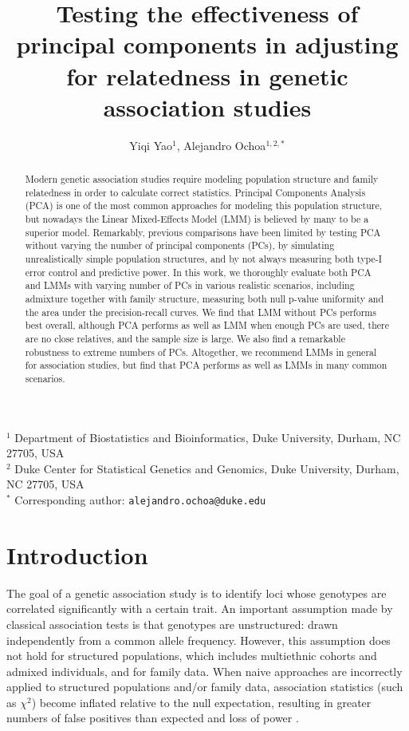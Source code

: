 \documentclass[11pt]{article}
\title{\Large \textbf{Testing the effectiveness of principal components in adjusting for relatedness in genetic association studies}}
\author{Yiqi Yao$^1$, Alejandro Ochoa$^{1,2,*}$}
\date{}
\begin{document}
\maketitle

\noindent
$^1$ Department of Biostatistics and Bioinformatics, Duke University, Durham, NC 27705, USA \\
$^2$ Duke Center for Statistical Genetics and Genomics, Duke University, Durham, NC 27705, USA \\
$^*$ Corresponding author: \texttt{alejandro.ochoa@duke.edu}


\begin{abstract}
  Modern genetic association studies require modeling population structure and family relatedness in order to calculate correct statistics.
  Principal Components Analysis (PCA) is one of the most common approaches for modeling this population structure, but nowadays the Linear Mixed-Effects Model (LMM) is believed by many to be a superior model.
  Remarkably, previous comparisons have been limited by testing PCA without varying the number of principal components (PCs), by simulating unrealistically simple population structures, and by not always measuring both type-I error control and predictive power.
  In this work, we thoroughly evaluate both PCA and LMMs with varying number of PCs in various realistic scenarios, including admixture together with family structure, measuring both null p-value uniformity and the area under the precision-recall curves.
  We find that LMM without PCs performs best overall, although PCA performs as well as LMM when enough PCs are used, there are no close relatives, and the sample size is large.
  We also find a remarkable robustness to extreme numbers of PCs.
  Altogether, we recommend LMMs in general for association studies, but find that PCA performs as well as LMMs in many common scenarios.
\end{abstract}



\clearpage
	
\section{Introduction} 

The goal of a genetic association study is to identify loci whose genotypes are correlated significantly with a certain trait.
An important assumption made by classical association tests is that genotypes are unstructured: drawn independently from a common allele frequency.
However, this assumption does not hold for structured populations, which includes multiethnic cohorts and admixed individuals, and for family data.
When naive approaches are incorrectly applied to structured populations and/or family data, association statistics (such as $\chi^2$) become inflated relative to the null expectation, resulting in greater numbers of false positives than expected and loss of power \citep{devlin_genomic_1999, voight_confounding_2005, astle_population_2009}.
\end{document}
